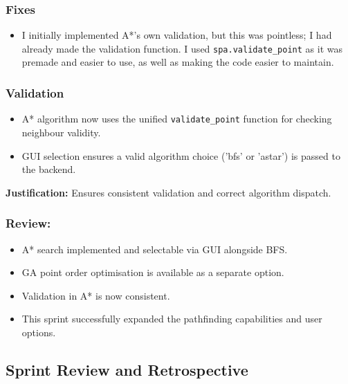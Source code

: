 \subsubsection{Fixes}
\begin{itemize}
	\item I initially implemented A*'s own validation, but this was pointless; I had already made the validation function. I used \verb|spa.validate_point| as it was premade and easier to use, as well as making the code easier to maintain.
\end{itemize}

\subsubsection{Validation}
\begin{itemize}
	\item A* algorithm now uses the unified \verb|validate_point| function for checking neighbour validity.
	\item GUI selection ensures a valid algorithm choice ('bfs' or 'astar') is passed to the backend.
\end{itemize}
\textbf{Justification:} Ensures consistent validation and correct algorithm dispatch.

\subsubsection{Review:}
\begin{itemize}
	\item A* search implemented and selectable via GUI alongside BFS.
	\item GA point order optimisation is available as a separate option.
	\item Validation in A* is now consistent.
	\item This sprint successfully expanded the pathfinding capabilities and user options.
\end{itemize}

\clearpage
\subsection{Sprint Review and Retrospective}

